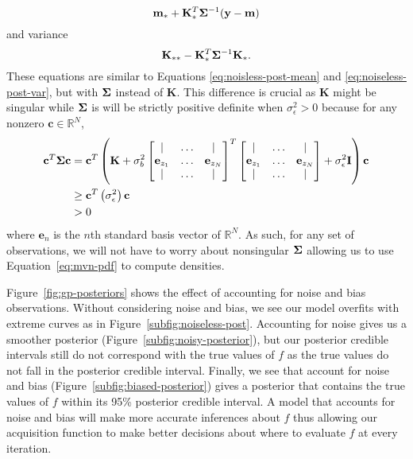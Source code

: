 \begin{equation*}
    \mathbf{m}_* + \mathbf{K}_*^T \boldsymbol{\Sigma}^{-1} (\mathbf{y} - \mathbf{m})
\end{equation*}
and variance
\begin{equation*}
    \mathbf{K}_{* *} - \mathbf{K}_*^T \boldsymbol{\Sigma}^{-1} \mathbf{K}_*.
\end{equation*}
These equations are similar to Equations \ref{eq:noisless-post-mean} and \ref{eq:noiseless-post-var}, but
with $\boldsymbol{\Sigma}$ instead of $\mathbf{K}$.
This difference is crucial as $\mathbf{K}$ might be singular
while $\boldsymbol{\Sigma}$ is will be strictly positive definite when $\sigma_{\epsilon}^2 > 0$ because
for any nonzero $\mathbf{c} \in \mathbb{R}^{N}$,
\begin{align*}
    \mathbf{c}^{T} \boldsymbol{\Sigma} \mathbf{c}
    &= \mathbf{c}^{T} \left(\mathbf{K} + 
    \sigma^2_b
    \begin{bmatrix}
        \vert & \ldots & \vert \\
        \mathbf{e}_{z_1} &  \ldots & \mathbf{e}_{z_N} \\
        \vert & \ldots & \vert \\
    \end{bmatrix}^{T}
    \begin{bmatrix}
        \vert & \ldots & \vert \\
        \mathbf{e}_{z_1} &  \ldots & \mathbf{e}_{z_N} \\
        \vert & \ldots & \vert \\
    \end{bmatrix}
    + \sigma^2_{\epsilon} \mathbf{I}
    \right) \mathbf{c} \\
    &\geq \mathbf{c}^{T} \left(\sigma_{\epsilon}^{2}\right) \mathbf{c} \\
    & > 0
\end{align*}
where $\mathbf{e}_n$ is the $n$th standard basis vector of $\mathbb{R}^{N}$.
As such, for any set of observations, we will not have to worry about nonsingular $\boldsymbol{\Sigma}$ allowing us to
use Equation~\ref{eq:mvn-pdf} to compute densities.

Figure~\ref{fig:gp-posteriors} shows the effect of accounting for noise and bias observations.
Without considering noise and bias, we see our model overfits with extreme curves as in Figure~\ref{subfig:noiseless-post}.
Accounting for noise gives us a smoother posterior (Figure~\ref{subfig:noisy-posterior}), but our posterior credible intervals still do not correspond with the true values of $f$ as the true values do not fall in the posterior credible interval.
Finally, we see that account for noise and bias (Figure~\ref{subfig:biased-posterior})
gives a posterior that contains the true values of $f$ within its 95\% posterior credible interval.
A model that accounts for noise and bias will make more accurate inferences about $f$ thus
allowing our acquisition function to make better decisions about where to evaluate $f$ at every iteration.


